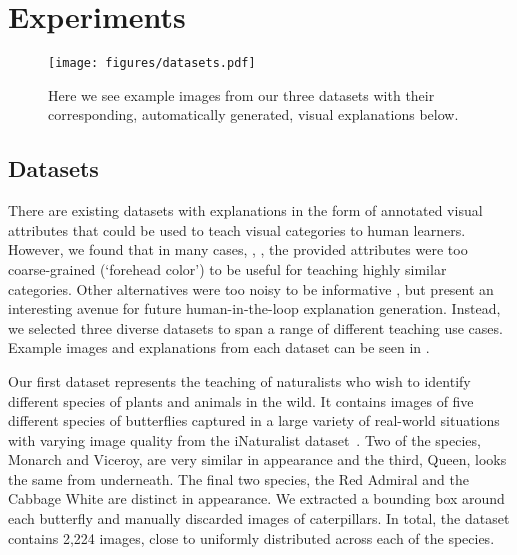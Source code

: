 \documentclass[../main.tex]{subfiles}
\begin{document}
\section{Experiments}

\begin{figure*}[t]
\centering
\texttt{[image: figures/datasets.pdf]}
\caption{Here we see example images from our three datasets with their corresponding, automatically generated, visual explanations below.} 
\label{fig:datasets}
\vspace{-10pt}
\end{figure*}


\subsection{Datasets}
There are existing datasets with explanations in the form of annotated visual attributes that could be used to teach visual categories to human learners.
However, we found that in many cases, \eg, \cite{wah2011caltech}, the provided attributes were too coarse-grained (\eg `forehead color') to be useful for teaching highly similar categories.
Other alternatives were too noisy to be informative \eg \cite{deng2016}, but present an interesting avenue for future human-in-the-loop explanation generation.
Instead, we selected three diverse datasets to span a range of different teaching use cases.
Example images and explanations from each dataset can be seen in . 

Our first dataset represents the teaching of naturalists who wish to identify different species of plants and animals in the wild. 
It contains images of five different species of butterflies captured in a large variety of real-world situations with varying image quality from the iNaturalist dataset~\cite{van2017inaturalist}.
Two of the species, Monarch and Viceroy, are very similar in appearance and the third, Queen, looks the same from underneath.
The final two species, the Red Admiral and the Cabbage White are distinct in appearance. 
We extracted a bounding box around each butterfly and manually discarded images of caterpillars.
In total, the dataset contains 2,224 images, close to uniformly distributed across each of the species. 
\end{document}
